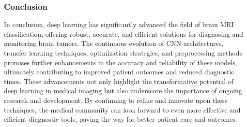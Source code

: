 \subsubsection{Conclusion}

In conclusion, deep learning has significantly advanced the field of brain MRI classification, offering robust, accurate, and efficient solutions for diagnosing and monitoring brain tumors. The continuous evolution of CNN architectures, transfer learning techniques, optimization strategies, and preprocessing methods promises further enhancements in the accuracy and reliability of these models, ultimately contributing to improved patient outcomes and reduced diagnostic times. These advancements not only highlight the transformative potential of deep learning in medical imaging but also underscore the importance of ongoing research and development. By continuing to refine and innovate upon these techniques, the medical community can look forward to even more effective and efficient diagnostic tools, paving the way for better patient care and outcomes.